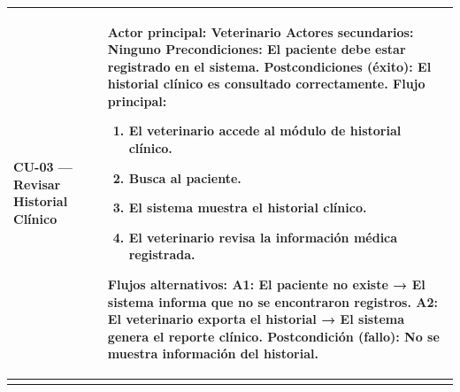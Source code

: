 \documentclass[
]{article}
\newcounter{none} %
\begin{document}
{\def\LTcaptype{none} %
\begin{longtable}[]{|
  >{\raggedright\arraybackslash}p{}|
  >{\raggedright\arraybackslash}p{}|}
\hline
\begin{minipage}[b]{\linewidth}\raggedright
\textbf{CU-03 --- Revisar Historial Clínico}
\end{minipage} & \begin{minipage}[b]{\linewidth}\raggedright
\textbf{Actor principal:} Veterinario \textbf{Actores secundarios:} Ninguno \textbf{Precondiciones:} El
paciente debe estar registrado en el sistema. \textbf{Postcondiciones (éxito):} El historial clínico es consultado
correctamente. \textbf{Flujo principal:}

\begin{enumerate}
\def\labelenumi{\arabic{enumi}.}
\item
  El veterinario accede al módulo de historial clínico.
\item
  Busca al paciente.
\item
  El sistema muestra el historial clínico.
\item
  El veterinario revisa la información médica registrada.
\end{enumerate}

\textbf{Flujos alternativos:} A1: El paciente no existe → El sistema informa que no se encontraron
registros. A2: El veterinario exporta el historial → El sistema genera
el reporte clínico. \textbf{Postcondición (fallo):} No se muestra información del historial.
\end{minipage} \\
\hline
\endhead
\hline
\endlastfoot
\end{longtable}
}
\end{document}

